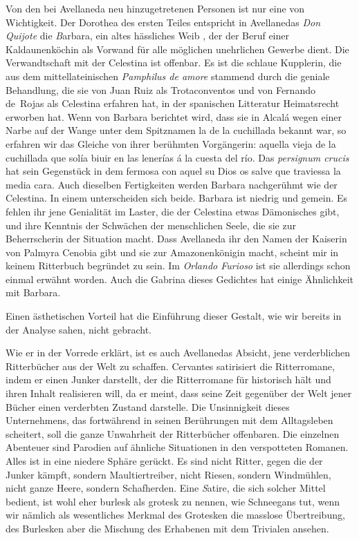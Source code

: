 Von den bei Avellaneda neu hinzugetretenen Personen ist nur eine
von Wichtigkeit. Der Dorothea des ersten Teiles entspricht in Avellanedas
{\it Don Quijote} die {\emph Barbara}, ein altes hässliches Weib , der der
Beruf einer Kaldaunenköchin als Vorwand für alle möglichen unehrlichen
Gewerbe dient. Die Verwandtschaft mit der Celestina ist offenbar. Es
ist die schlaue Kupplerin, die aus dem mittellateinischen {\it Pamphilus de
amore} stammend durch die geniale Behandlung, die sie von Juan Ruiz
als Trotaconventos und von Fernando de~Rojas als Celestina erfahren
hat, in der spanischen Litteratur Heimatsrecht erworben hat. Wenn von
Barbara berichtet wird, dass sie in Alcalá wegen einer Narbe auf der
Wange unter dem Spitznamen {\itquoted\spanish la de la cuchillada} bekannt war, so
erfahren wir das Gleiche von ihrer berühmten Vorgängerin: {\itquoted\spanish aquella
vieja de la cuchillada que solía biuir en las lenerías á la cuesta del río}.
Das {\it persignum crucis} hat sein Gegenstück in dem {\itquoted\spanish fermosa
con aquel su Dios os salve que traviessa la media cara}.
Auch dieselben Fertigkeiten werden Barbara nachgerühmt wie der Celestina. In
einem unterscheiden sich beide. Barbara ist niedrig und gemein. Es fehlen ihr jene
Genialität im Laster, die der Celestina etwas Dämonisches gibt, und ihre
Kenntnis der Schwächen der menschlichen Seele, die sie zur Beherrscherin
der Situation macht. Dass Avellaneda ihr den Namen der Kaiserin von
Palmyra Cenobia gibt und sie zur Amazonenkönigin macht, scheint mir
in keinem Ritterbuch begründet zu sein. Im {\it Orlando Furioso} ist sie
allerdings schon einmal erwähnt worden. Auch die Gabrina dieses
Gedichtes hat einige Ähnlichkeit mit Barbara.

Einen ästhetischen Vorteil hat die Einführung dieser Gestalt, wie
wir bereits in der Analyse sahen, nicht gebracht.

\blankline

Wie er in der Vorrede erklärt, ist es auch Avellanedas Absicht,
jene verderblichen Ritterbücher aus der Welt zu schaffen. Cervantes
satirisiert die Ritterromane, indem er einen Junker darstellt, der die
Ritterromane für historisch hält und ihren Inhalt realisieren will, da er
meint, dass seine Zeit gegenüber der Welt jener Bücher einen verderbten
Zustand darstelle. Die Unsinnigkeit dieses Unternehmens, das fortwährend
in seinen Berührungen mit dem Alltagsleben scheitert, soll die ganze
Unwahrheit der Ritterbücher offenbaren. Die einzelnen Abenteuer sind
Parodien auf ähnliche Situationen in den verspotteten Romanen. Alles
ist in eine niedere Sphäre gerückt. Es sind nicht Ritter, gegen die der
Junker kämpft, sondern Maultiertreiber, nicht Riesen, sondern Windmühlen,
nicht ganze Heere, sondern Schafherden. Eine {\emph Satire,} die sich solcher
Mittel bedient, ist wohl eher burlesk als grotesk zu nennen, wie
Schneegans tut, wenn wir nämlich als wesentliches Merkmal des Grotesken
die masslose Übertreibung, des Burlesken aber die Mischung des Erhabenen
mit dem Trivialen ansehen.


